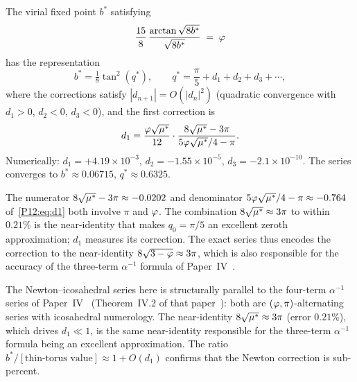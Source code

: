 \begin{theorem}
\label{P12:thm:C}
The virial fixed point $b^*$ satisfying
\begin{equation}
  \frac{15}{8}\,\frac{\arctan\sqrt{8b^*}}{\sqrt{8b^*}} \;=\; \varphi
  \label{P12:eq:virial_cond}
\end{equation}
has the representation
\begin{equation}
  \boxed{
  b^* = \tfrac{1}{8}\tan^2(q^*),\qquad
  q^* = \frac{\pi}{5}+d_1+d_2+d_3+\cdots,
  }
  \label{P12:eq:bstar}
\end{equation}
where the corrections satisfy $|d_{n+1}|=O(|d_n|^2)$
(quadratic convergence with $d_1>0$, $d_2<0$, $d_3<0$), and the first correction is
\begin{equation}
  d_1 = \frac{\varphi\sqrt{\mu^*}}{12}\cdot
  \frac{8\sqrt{\mu^*}-3\pi}{5\varphi\sqrt{\mu^*}/4-\pi}.
  \label{P12:eq:d1}
\end{equation}
Numerically: $d_1=+4.19\times10^{-3}$,
$d_2=-1.55\times10^{-5}$,
$d_3=-2.1\times10^{-10}$.
The series converges to $b^*\approx0.06715$, $q^*\approx0.6325$.
\end{theorem}

\begin{remark}[Structure of $d_1$]
\label{P12:rem:d1_structure}
The numerator $8\sqrt{\mu^*}-3\pi\approx-0.0202$ and denominator
$5\varphi\sqrt{\mu^*}/4-\pi\approx-0.764$ of~\eqref{P12:eq:d1}
both involve $\pi$ and $\varphi$.
The combination $8\sqrt{\mu^*}\approx3\pi$ to within $0.21\%$
is the near-identity that makes $q_0=\pi/5$ an excellent zeroth
approximation; $d_1$ measures its correction.
The exact series thus encodes the correction to the near-identity
$8\sqrt{3-\varphi}\approx3\pi$, which is also responsible for the
accuracy of the three-term $\alpha^{-1}$ formula of Paper~IV~\cite{Paper4}.
\end{remark}

\begin{remark}
\label{P12:rem:alpha_parallel}
The Newton--icosahedral series here is structurally parallel to
the four-term $\alpha^{-1}$ series of Paper~IV~\cite{Paper4}
(Theorem~IV.2 of that paper~\cite{Paper4}):
both are $(\varphi,\pi)$-alternating series with icosahedral numerology.
The near-identity $8\sqrt{\mu^*}\approx3\pi$ (error $0.21\%$),
which drives $d_1\ll1$, is the same near-identity responsible for
the three-term $\alpha^{-1}$ formula being an excellent approximation.
The ratio $b^*/[\text{thin-torus value}]\approx1+O(d_1)$ confirms
that the Newton correction is sub-percent.
\end{remark}

